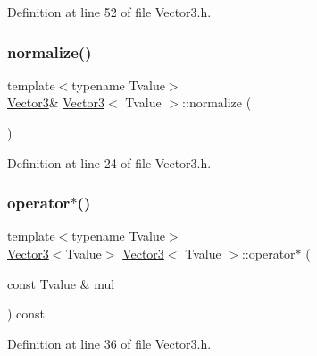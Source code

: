 Definition at line 52 of file Vector3.\+h.

\mbox{\label{class_vector3_a88f8d29ec51d966db7c36e2626040cf5}} 
\subsubsection{\texorpdfstring{normalize()}{normalize()}}
{\footnotesize\ttfamily template$<$typename Tvalue$>$ \\
\hyperlink{class_vector3}{Vector3}\& \hyperlink{class_vector3}{Vector3}$<$ Tvalue $>$\+::normalize (\begin{DoxyParamCaption}{ }\end{DoxyParamCaption})\hspace{0.3cm}{\ttfamily [inline]}}



Definition at line 24 of file Vector3.\+h.

\mbox{\label{class_vector3_a6f27f180b7dfa13df47fb0d5b53abc94}} 
\subsubsection{\texorpdfstring{operator$\ast$()}{operator*()}\hspace{0.1cm}{\footnotesize\ttfamily [1/2]}}
{\footnotesize\ttfamily template$<$typename Tvalue$>$ \\
\hyperlink{class_vector3}{Vector3}$<$Tvalue$>$ \hyperlink{class_vector3}{Vector3}$<$ Tvalue $>$\+::operator$\ast$ (\begin{DoxyParamCaption}\item[{const Tvalue \&}]{mul }\end{DoxyParamCaption}) const\hspace{0.3cm}{\ttfamily [inline]}}



Definition at line 36 of file Vector3.\+h.

\mbox{\label{class_vector3_abf9dfd8150ddce3d68de3a05f359f8c7}} 
